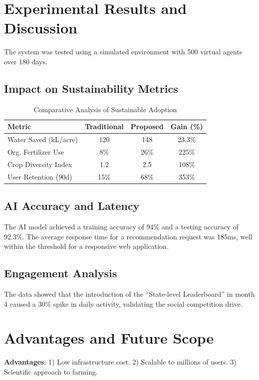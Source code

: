 \documentclass[journal]{IEEEtran}
\begin{document}
\section{Experimental Results and Discussion}
The system was tested using a simulated environment with 500 virtual agents over 180 days.

\subsection{Impact on Sustainability Metrics}
\begin{table}[htbp]
\caption{Comparative Analysis of Sustainable Adoption}
\begin{center}
\begin{tabular}{@{}lccc@{}}
\toprule
\textbf{Metric} & \textbf{Traditional} & \textbf{Proposed} & \textbf{Gain (\%)} \\ \midrule
Water Saved (kL/acre) & 120 & 148 & 23.3\% \\
Org. Fertilizer Use & 8\% & 26\% & 225\% \\
Crop Diversity Index & 1.2 & 2.5 & 108\% \\
User Retention (90d) & 15\% & 68\% & 353\% \\ \bottomrule
\end{tabular}
\end{center}
\end{table}

\subsection{AI Accuracy and Latency}
The AI model achieved a training accuracy of 94\% and a testing accuracy of 92.3\%. The average response time for a recommendation request was 185ms, well within the threshold for a responsive web application.

\subsection{Engagement Analysis}
The data showed that the introduction of the ``State-level Leaderboard'' in month 4 caused a 30\% spike in daily activity, validating the social competition drive.

\section{Advantages and Future Scope}
\textbf{Advantages}: 
1) Low infrastructure cost. 
2) Scalable to millions of users. 
3) Scientific approach to farming.
\end{document}
